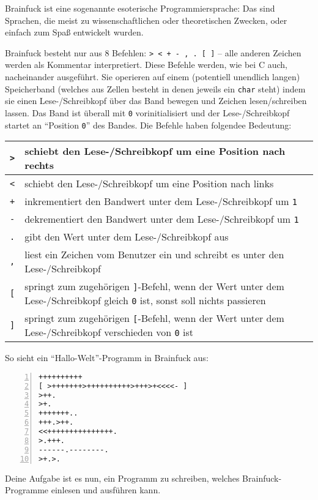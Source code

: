 \documentclass{uebungszettel}
\begin{document}
\begin{aufg}
Brainfuck ist eine sogenannte esoterische Programmiersprache: Das sind Sprachen, die meist zu wissenschaftlichen oder theoretischen Zwecken, oder einfach zum Spaß entwickelt wurden. 

Brainfuck besteht nur aus $8$ Befehlen: \verb|> < + - , . [ ]| -- alle anderen Zeichen werden als Kommentar interpretiert. Diese Befehle werden, wie bei C auch, nacheinander ausgeführt. Sie operieren auf einem (potentiell unendlich langen) Speicherband (welches aus Zellen besteht in denen jeweils ein \verb|char| steht) indem sie einen Lese-/Schreibkopf über das Band bewegen und Zeichen lesen/schreiben lassen. Das Band ist überall mit \verb|0| vorinitialisiert und der Lese-/Schreibkopf startet an ``Position \verb|0|'' des Bandes. Die Befehle haben folgendee Bedeutung:

\medskip\noindent \begin{tabularx}{\textwidth}{@{}|c|X|} \hline
\verb|>| & schiebt den Lese-/Schreibkopf um eine Position nach rechts \\\hline
\verb|<| & schiebt den Lese-/Schreibkopf um eine Position nach links \\\hline
\verb|+| & inkrementiert den Bandwert unter dem Lese-/Schreibkopf um \verb|1| \\\hline
\verb|-| & dekrementiert den Bandwert unter dem Lese-/Schreibkopf um \verb|1| \\\hline
\verb|.| & gibt den Wert unter dem Lese-/Schreibkopf aus \\\hline
\verb|,| & liest ein Zeichen vom Benutzer ein und schreibt es unter den Lese-/Schreibkopf \\\hline
\verb|[| & springt zum zugehörigen \verb|]|-Befehl, wenn der Wert unter dem Lese-/Schreibkopf gleich \verb|0| ist, sonst soll nichts passieren\\\hline
\verb|]| & springt zum zugehörigen \verb|[|-Befehl, wenn der Wert unter dem Lese-/Schreibkopf verschieden von \verb|0| ist\\\hline
\end{tabularx}

\bigskip
\noindent So sieht ein ``Hallo-Welt''-Programm in Brainfuck aus:

\medskip \begin{codelisting}
\begin{lstlisting}[numbers=left,numberstyle=\tiny,frame=tlrb,mathescape=true]
++++++++++
[ >+++++++>++++++++++>+++>+<<<<- ]
>++.
>+.
+++++++..
+++.>++.
<<+++++++++++++++.
>.+++.
------.--------.
>+.>.
\end{lstlisting}
\end{codelisting}
Deine Aufgabe ist es nun, ein Programm zu schreiben, welches Brainfuck-Programme einlesen und ausführen kann. 
\end{aufg}
\end{document}
